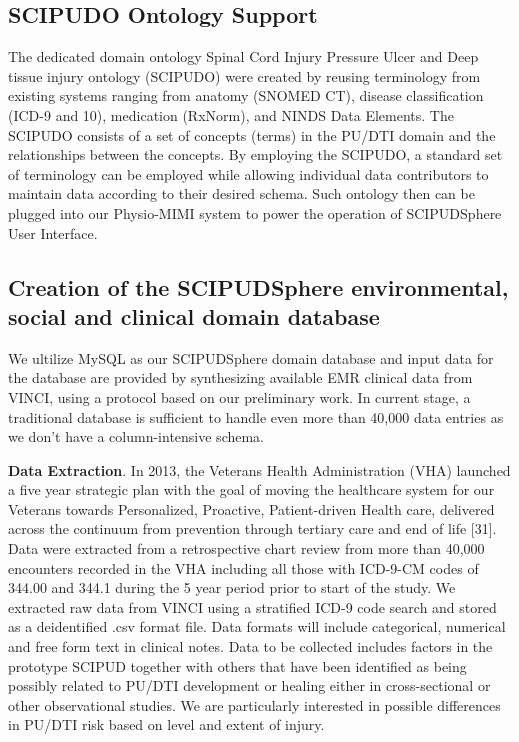 \documentclass{amia}
\begin{document}
\subsection{SCIPUDO Ontology Support}
The dedicated domain ontology Spinal Cord Injury Pressure Ulcer and Deep tissue injury ontology (SCIPUDO) were created by reusing terminology from existing systems ranging from anatomy (SNOMED CT), disease classification (ICD-9 and 10), medication (RxNorm), and NINDS Data Elements. The SCIPUDO consists of a set of concepts (terms) in the PU/DTI domain and the relationships between the concepts. By employing the SCIPUDO, a standard set of terminology can be employed while allowing individual data contributors to maintain data according to their desired schema. Such ontology then can be plugged into our Physio-MIMI system to power the operation of SCIPUDSphere User Interface.

\subsection{Creation of the SCIPUDSphere environmental, social and clinical domain database}
We ultilize MySQL as our SCIPUDSphere domain database and input data for the database are provided by synthesizing available EMR clinical data from VINCI, using a protocol based on our preliminary work. In current stage, a traditional database is sufficient to handle even more than 40,000 data entries as we don't have a column-intensive schema.

{\bf Data Extraction}. In 2013, the Veterans Health Administration (VHA) launched a five year strategic plan with the goal of moving the healthcare system for our Veterans towards Personalized, Proactive, Patient-driven Health care, delivered across the continuum from prevention through tertiary care and end of life [31]. Data were extracted from a retrospective chart review from more than 40,000 encounters recorded in the VHA including all those with ICD-9-CM codes of 344.00 and 344.1 during the 5 year period prior to start of the study. We extracted raw data from VINCI using a stratified ICD-9 code search and stored as a deidentified .csv format file. Data formats will include categorical, numerical and free form text in clinical notes. Data to be collected includes factors in the prototype SCIPUD together with others that have been identified as being possibly related to PU/DTI development or healing either in cross-sectional or other observational studies. We are particularly interested in possible differences in PU/DTI risk based on level and extent of injury.
\end{document}
